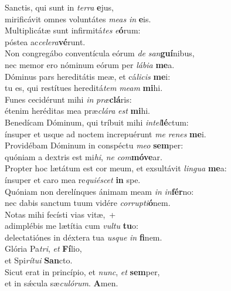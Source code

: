 \evenverse Sanctis, qui sunt in \textit{ter}\textit{ra} \textbf{e}jus,~\*\\
\evenverse mirificávit omnes voluntátes \textit{me}\textit{as} \textit{in} \textbf{e}is.\\
\oddverse Multiplicátæ sunt infirmitá\textit{tes} \textit{e}\textbf{ó}rum:~\*\\
\oddverse póstea ac\textit{ce}\textit{le}\textit{ra}\textbf{vé}runt.\\
\evenverse Non congregábo conventícula eórum \textit{de} \textit{san}\textbf{guí}nibus,~\*\\
\evenverse nec memor ero nóminum eórum per \textit{lá}\textit{bi}\textit{a} \textbf{me}a.\\
\oddverse Dóminus pars hereditátis meæ, et cá\textit{li}\textit{cis} \textbf{me}i:~\*\\
\oddverse tu es, qui restítues hereditá\textit{tem} \textit{me}\textit{am} \textbf{mi}hi.\\
\evenverse Funes cecidérunt mihi \textit{in} \textit{præ}\textbf{clá}ris:~\*\\
\evenverse étenim heréditas mea præ\textit{clá}\textit{ra} \textit{est} \textbf{mi}hi.\\
\oddverse Benedícam Dóminum, qui tríbuit mihi \textit{in}\textit{tel}\textbf{lé}ctum:~\*\\
\oddverse ínsuper et usque ad noctem increpuérunt \textit{me} \textit{re}\textit{nes} \textbf{me}i.\\
\evenverse Providébam Dóminum in conspéctu \textit{me}\textit{o} \textbf{sem}per:~\*\\
\evenverse quóniam a dextris est mi\textit{hi}, \textit{ne} \textit{com}\textbf{mó}\textbf{ve}ar.\\
\oddverse Propter hoc lætátum est cor meum, et exsultávit \textit{lin}\textit{gua} \textbf{me}a:~\*\\
\oddverse ínsuper et caro mea re\textit{qui}\textit{é}\textit{scet} \textbf{in} spe.\\
\evenverse Quóniam non derelínques ánimam meam \textit{in} \textit{in}\textbf{fér}no:~\*\\
\evenverse nec dabis sanctum tuum vidére \textit{cor}\textit{rup}\textit{ti}\textbf{ó}nem.\\
\oddverse Notas mihi fecísti vias vitæ,~+\\
\oddverse  adimplébis me lætítia cum \textit{vul}\textit{tu} \textbf{tu}o:~\*\\
\oddverse delectatiónes in déxtera tua \textit{us}\textit{que} \textit{in} \textbf{fi}nem.\\
\evenverse Glória Pa\textit{tri}, \textit{et} \textbf{Fí}lio,~\*\\
\evenverse et Spi\textit{rí}\textit{tu}\textit{i} \textbf{San}cto.\\
\oddverse Sicut erat in princípio, et \textit{nunc}, \textit{et} \textbf{sem}per,~\*\\
\oddverse et in sǽcula sæ\textit{cu}\textit{ló}\textit{rum}. \textbf{A}men.\\
